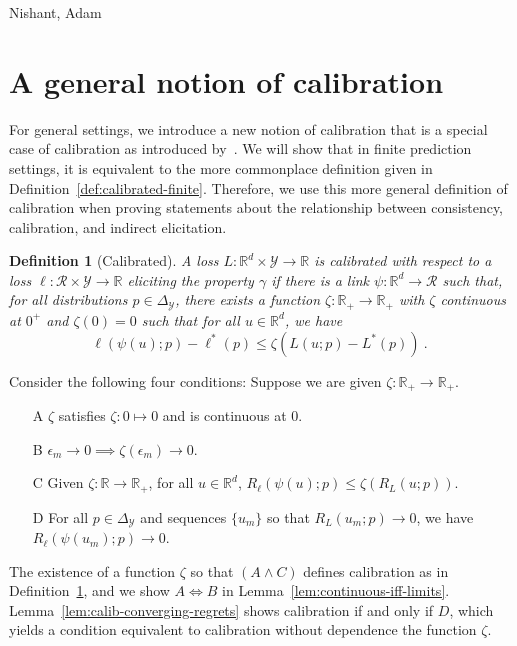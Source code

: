 \documentclass{article}
\newcommand{\reals}{\mathbb{R}}
\newcommand{\simplex}{\Delta_\Y}
\newcommand{\R}{\mathcal{R}}
\newcommand{\Y}{\mathcal{Y}}
\newcommand{\risk}[1]{#1^*}
\newtheorem{definition}{Definition}
\begin{document}
\begin{ack}
Nishant, Adam
\end{ack}




\newpage
\appendix
\section{A general notion of calibration}\label{app:calibration}
For general settings, we introduce a new notion of calibration that is a special case of calibration as introduced by~\cite[Chapter 3]{steinwart2008support}.
We will show that in finite prediction settings, it is equivalent to the more commonplace definition given in Definition~\ref{def:calibrated-finite}.
Therefore, we use this more general definition of calibration when proving statements about the relationship between consistency, calibration, and indirect elicitation.

\begin{definition}[Calibrated]\label{def:calibrated-general}
	A loss $L:\reals^d \times \Y \to \reals$ is \emph{calibrated} with respect to a loss $\ell : \R \times \Y \to \reals$ eliciting the property $\gamma$ if there is a link $\psi : \reals^d \to \R$ such that, for all distributions $p \in \simplex$, there exists a function $\zeta : \reals_+ \to \reals_+$ with $\zeta$ continuous at $0^+$ and $\zeta(0) = 0$ such that for all $u \in \reals^d$, we have
	\begin{equation}\label{eq:calibrated-general}
	\ell( \psi(u); p) - \risk{\ell}(p)  \leq \zeta \left(  L(u;p) - \risk{L}(p) \right)~.~
	\end{equation}
\end{definition}

Consider the following four conditions: Suppose we are given $\zeta:\reals_+ \to \reals_+$.
\begin{enumerate}
	\item [A] $\zeta$ satisfies $\zeta : 0 \mapsto 0$ and is continuous at $0$.
	\item [B] $\epsilon_m \to 0 \implies \zeta(\epsilon_m) \to 0$.
	\item [C] Given $\zeta:\reals \to \reals_+$, for all $u \in \reals^d$, $R_\ell(\psi(u); p) \leq \zeta(R_L(u;p))$.
	\item [D] For all $p \in \simplex$ and sequences $\{u_m\}$ so that $R_L(u_m; p) \to 0$, we have $R_\ell(\psi(u_m); p) \to 0$.
\end{enumerate}
The existence of a function $\zeta$ so that $(A \wedge C)$ defines calibration as in Definition~\ref{def:calibrated-general}, and we show $A \iff B$ in Lemma~\ref{lem:continuous-iff-limits}.  
Lemma~\ref{lem:calib-converging-regrets} shows calibration if and only if $D$, which yields a condition equivalent to calibration without dependence the function $\zeta$.
\end{document}
